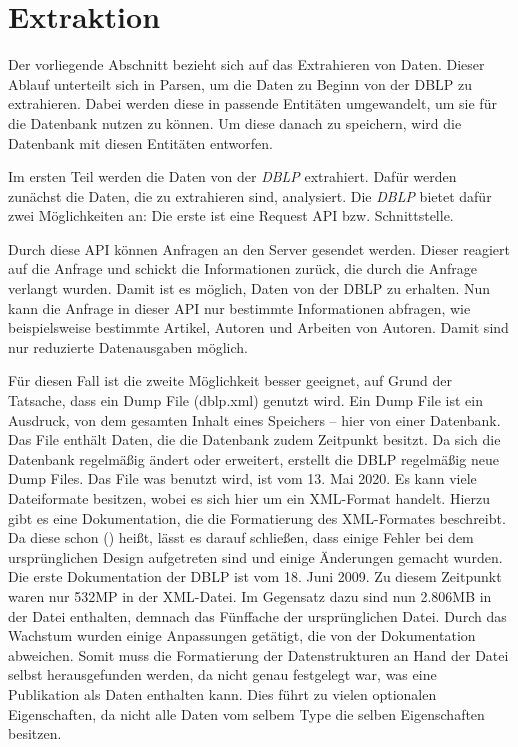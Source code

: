 \newpage
\section{Extraktion}


Der vorliegende Abschnitt bezieht sich auf das Extrahieren von Daten. Dieser Ablauf unterteilt sich in Parsen, um die Daten zu Beginn von der DBLP zu extrahieren. Dabei werden diese in passende Entitäten umgewandelt, um sie für die Datenbank nutzen zu können. Um diese danach zu speichern, wird die Datenbank mit diesen Entitäten entworfen. 

Im ersten Teil werden die Daten von der \textit{DBLP} extrahiert. Dafür werden zunächst die Daten, die zu extrahieren sind, analysiert. Die \textit{DBLP} bietet dafür zwei Möglichkeiten an: Die erste ist eine Request API bzw. Schnittstelle. 

Durch diese API können Anfragen an den Server gesendet werden. Dieser reagiert auf die Anfrage und schickt die Informationen zurück, die durch die Anfrage verlangt wurden. Damit ist es möglich, Daten von der DBLP zu erhalten. Nun kann die Anfrage in dieser API nur bestimmte Informationen abfragen, wie beispielsweise bestimmte Artikel, Autoren und Arbeiten von Autoren. Damit sind nur reduzierte Datenausgaben möglich.





Für diesen Fall ist die zweite Möglichkeit besser geeignet, auf Grund der Tatsache, dass ein Dump File (dblp.xml) genutzt wird. Ein Dump File ist ein Ausdruck, von dem gesamten Inhalt eines Speichers – hier von einer Datenbank. Das File enthält Daten, die die Datenbank zudem Zeitpunkt besitzt. Da sich die Datenbank regelmäßig ändert oder erweitert, erstellt die DBLP regelmäßig neue Dump Files. Das File was benutzt wird, ist vom 13. Mai 2020. Es kann viele Dateiformate besitzen, wobei es sich hier um ein XML-Format handelt. 
Hierzu gibt es eine Dokumentation, die die Formatierung des XML-Formates beschreibt. Da diese schon (\cite{DBLP:journals/pvldb/Ley09}) heißt, lässt es darauf schließen, dass einige Fehler bei dem ursprünglichen Design aufgetreten sind und einige Änderungen gemacht wurden. Die erste Dokumentation der DBLP ist vom 18. Juni 2009. Zu diesem Zeitpunkt waren nur 532MP in der XML-Datei. Im Gegensatz dazu sind nun 2.806MB in der Datei enthalten, demnach das Fünffache der ursprünglichen Datei. Durch das Wachstum wurden einige Anpassungen getätigt, die von der Dokumentation abweichen. Somit muss die Formatierung der Datenstrukturen an Hand der Datei selbst herausgefunden werden, da nicht genau festgelegt war, was eine Publikation als Daten enthalten kann. Dies führt zu vielen optionalen Eigenschaften, da nicht alle Daten vom selbem Type die selben Eigenschaften besitzen. 

